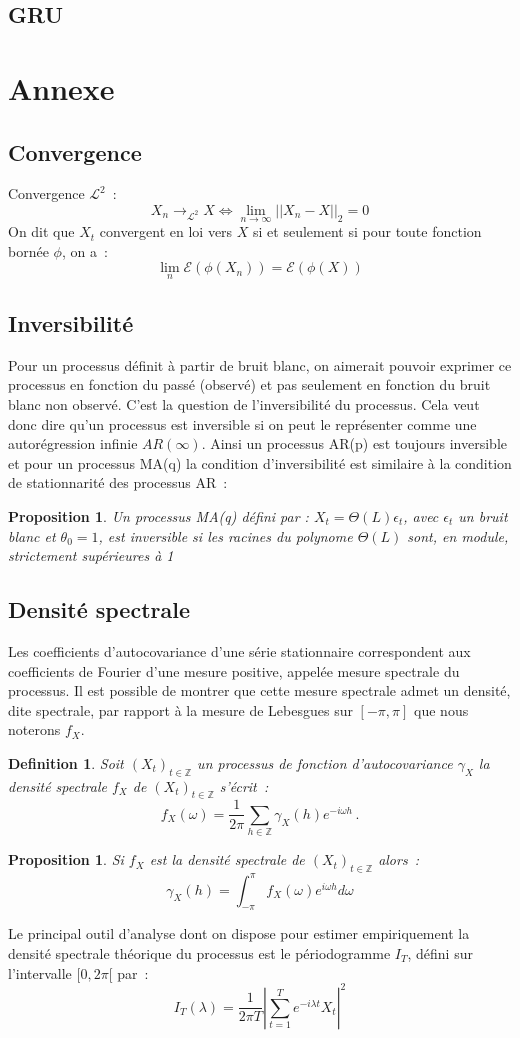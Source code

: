 \documentclass[11pt]{scrartcl} %
\newtheorem{Def}[theorem]{Definition}
\newtheorem{pro}[theorem]{Proposition}
\newcommand{\Xt}{\left(X_t\right)_{t\in\mathbb{Z}}}
\begin{document}
\subsection{GRU}
\section{Annexe}
\subsection{Convergence}
Convergence $\mathcal{L}^2$~:
$$
X_n\rightarrow_{\mathcal{L^2}} X \Leftrightarrow  \lim_{n\rightarrow \infty}||X_n-X||_2=0
$$
On dit que $X_t$ convergent en loi vers $X$ si et seulement si pour toute fonction bornée $\phi$, on a~:~
$$
\lim_{n}\mathcal{E}(\phi(X_n))=\mathcal{E}\left(\phi(X)\right)
$$
\subsection{Inversibilité}
Pour un processus définit à partir de bruit blanc, on aimerait pouvoir exprimer ce processus en fonction du passé (observé) et pas seulement en fonction du bruit blanc non observé. C'est la question de l'inversibilité du processus. Cela veut donc dire qu'un processus est inversible si on peut le représenter comme une autorégression infinie $AR(\infty)$. Ainsi un processus AR(p) est toujours inversible et pour un processus MA(q) la condition d'inversibilité est similaire à la condition de stationnarité des processus AR~:
\begin{pro}
Un processus MA(q) défini par : $X_t=\Theta(L)\epsilon_t$, avec $\epsilon_t$ un bruit blanc et $\theta_0=1$, est inversible si les racines du polynome $ \Theta(L)$ sont, en module, strictement supérieures à 1
\end{pro}
\subsection{Densité spectrale}
Les coefficients d'autocovariance d'une série stationnaire correspondent aux coefficients de Fourier d'une mesure positive, appelée mesure spectrale du processus. Il est possible de montrer que cette mesure spectrale admet un densité, dite spectrale, par rapport à la mesure de Lebesgues sur $[-\pi,\pi]$ que nous noterons $f_X$.
\begin{Def}
Soit $\Xt$ un processus de fonction d'autocovariance $\gamma_X$ la densité spectrale $f_X$ de $\Xt$ s'écrit~:
$$
f_X(\omega) = \frac{1}{2\pi}\sum_{h\in\mathbb{Z}}\gamma_X(h)e^{-i\omega h}\,.
$$
\end{Def}
\begin{pro}
Si $f_X$ est la densité spectrale de $\Xt$ alors~:
$$
\gamma_X(h)=\int_{-\pi}^{\pi}f_X(\omega)e^{i\omega h}d\omega
$$
\end{pro}
Le principal outil d'analyse dont on dispose pour estimer empiriquement la densité spectrale théorique du processus est le périodogramme $I_T$, défini sur l'intervalle $[0,2\pi[$ par~:
$$
I_T(\lambda)=\frac{1}{2\pi T}\left|\sum_{t=1}^Te^{-i\lambda t}X_t\right|^2
$$
\end{document}
